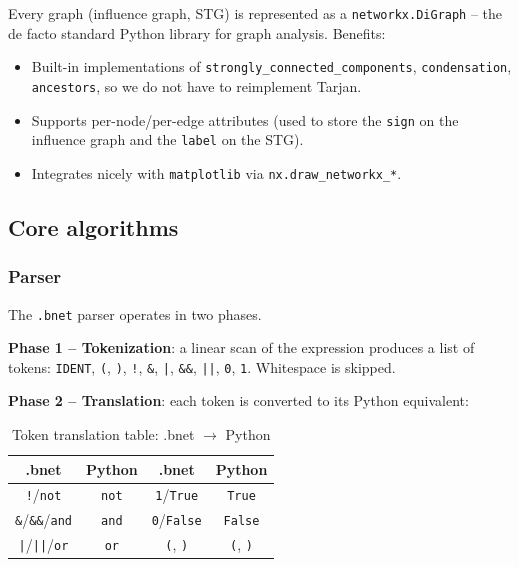 \documentclass[oneside,final]{hcmut-report}
\begin{document}
Every graph (influence graph, STG) is represented as a \texttt{networkx.DiGraph} -- the de facto standard Python library for graph analysis. Benefits:
\begin{itemize}[leftmargin=*]
    \item Built-in implementations of \texttt{strongly\_connected\_components}, \texttt{condensation}, \texttt{ancestors}, so we do not have to reimplement Tarjan.
    \item Supports per-node/per-edge attributes (used to store the \texttt{sign} on the influence graph and the \texttt{label} on the STG).
    \item Integrates nicely with \texttt{matplotlib} via \texttt{nx.draw\_networkx\_*}.
\end{itemize}

\subsection{Core algorithms}\label{subsec:algorithms}

\subsubsection{Parser}

The \texttt{.bnet} parser operates in two phases.

\textbf{Phase 1 -- Tokenization}: a linear scan of the expression produces a list of tokens: \texttt{IDENT}, \texttt{(}, \texttt{)}, \texttt{!}, \texttt{\&}, \texttt{|}, \texttt{\&\&}, \texttt{||}, \texttt{0}, \texttt{1}. Whitespace is skipped.

\textbf{Phase 2 -- Translation}: each token is converted to its Python equivalent:

\begin{table}[H]
    \centering
    \renewcommand{\arraystretch}{1.2}
    \begin{tabular}{|c|c|c|c|}
        \hline
        \rowcolor{bklight}
        \textbf{.bnet} & \textbf{Python} & \textbf{.bnet} & \textbf{Python} \\
        \hline
        \texttt{!}/\texttt{not} & \texttt{not} & \texttt{1}/\texttt{True} & \texttt{True} \\
        \hline
        \texttt{\&}/\texttt{\&\&}/\texttt{and} & \texttt{and} & \texttt{0}/\texttt{False} & \texttt{False} \\
        \hline
        \texttt{|}/\texttt{||}/\texttt{or} & \texttt{or} & \texttt{(}, \texttt{)} & \texttt{(}, \texttt{)} \\
        \hline
    \end{tabular}
    \caption{Token translation table: .bnet $\to$ Python}
    \label{tab:token-map}
\end{table}
\end{document}
